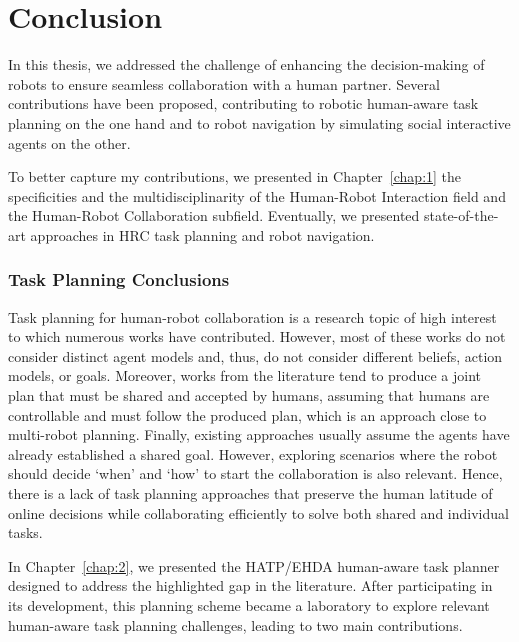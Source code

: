 \chapter*{Conclusion}


In this thesis, we addressed the challenge of enhancing the decision-making of robots to ensure seamless collaboration with a human partner. Several contributions have been proposed, contributing to robotic human-aware task planning on the one hand and to robot navigation by simulating social interactive agents on the other. 

To better capture my contributions, we presented in Chapter~\ref{chap:1} the specificities and the multidisciplinarity of the Human-Robot Interaction field and the Human-Robot Collaboration subfield. Eventually, we presented state-of-the-art approaches in HRC task planning and robot navigation. 

\subsection*{Task Planning Conclusions}

Task planning for human-robot collaboration is a research topic of high interest to which numerous works have contributed. However, most of these works do not consider distinct agent models and, thus, do not consider different beliefs, action models, or goals. Moreover, works from the literature tend to produce a joint plan that must be shared and accepted by humans, assuming that humans are controllable and must follow the produced plan, which is an approach close to multi-robot planning. Finally, existing approaches usually assume the agents have already established a shared goal. However, exploring scenarios where the robot should decide `when' and `how' to start the collaboration is also relevant. 
Hence, there is a lack of task planning approaches that preserve the human latitude of online decisions while collaborating efficiently to solve both shared and individual tasks. 


In Chapter~\ref{chap:2}, we presented the HATP/EHDA human-aware task planner designed to address the highlighted gap in the literature. After participating in its development, this planning scheme became a laboratory to explore relevant human-aware task planning challenges, leading to two main contributions. 

